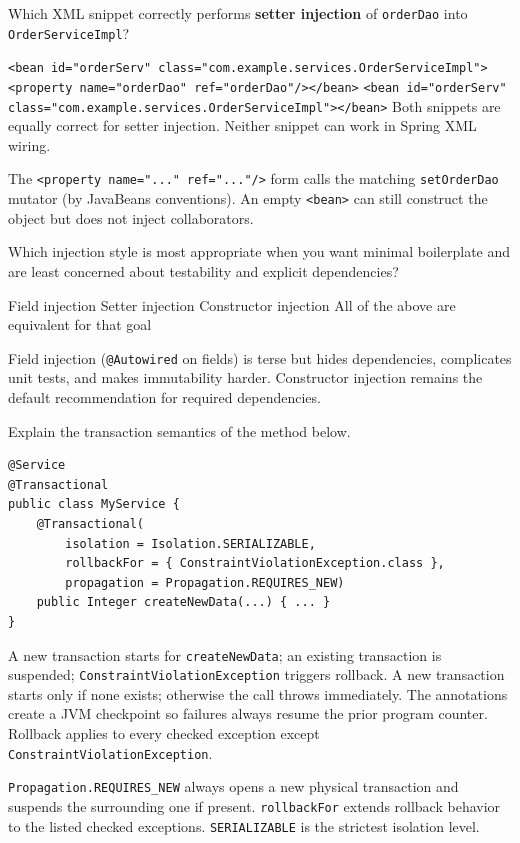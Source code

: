 \question[4]
Which XML snippet correctly performs \textbf{setter injection} of \texttt{orderDao} into \texttt{OrderServiceImpl}?
\begin{choices}
  \CorrectChoice \texttt{<bean id="orderServ" class="com.example.services.OrderServiceImpl"><property name="orderDao" ref="orderDao"/></bean>}
  \choice \texttt{<bean id="orderServ" class="com.example.services.OrderServiceImpl"></bean>}
  \choice Both snippets are equally correct for setter injection.
  \choice Neither snippet can work in Spring XML wiring.
\end{choices}
\begin{solution}
  The \texttt{<property name="..." ref="..."/>} form calls the matching \texttt{setOrderDao} mutator (by JavaBeans conventions). An empty \texttt{<bean>} can still construct the object but does not inject collaborators.
\end{solution}

\question[4]
Which injection style is most appropriate when you want minimal boilerplate and are least concerned about testability and explicit dependencies?
\begin{choices}
  \CorrectChoice Field injection
  \choice Setter injection
  \choice Constructor injection
  \choice All of the above are equivalent for that goal
\end{choices}
\begin{solution}
  Field injection (\texttt{@Autowired} on fields) is terse but hides dependencies, complicates unit tests, and makes immutability harder. Constructor injection remains the default recommendation for required dependencies.
\end{solution}

\question[4]
Explain the transaction semantics of the method below.
\begin{lstlisting}[style=java]
@Service
@Transactional
public class MyService {
    @Transactional(
        isolation = Isolation.SERIALIZABLE,
        rollbackFor = { ConstraintViolationException.class },
        propagation = Propagation.REQUIRES_NEW)
    public Integer createNewData(...) { ... }
}
\end{lstlisting}
\begin{choices}
  \CorrectChoice A new transaction starts for \texttt{createNewData}; an existing transaction is suspended; \texttt{ConstraintViolationException} triggers rollback.
  \choice A new transaction starts only if none exists; otherwise the call throws immediately.
  \choice The annotations create a JVM checkpoint so failures always resume the prior program counter.
  \choice Rollback applies to every checked exception except \texttt{ConstraintViolationException}.
\end{choices}
\begin{solution}
  \texttt{Propagation.REQUIRES\_NEW} always opens a new physical transaction and suspends the surrounding one if present. \texttt{rollbackFor} extends rollback behavior to the listed checked exceptions. \texttt{SERIALIZABLE} is the strictest isolation level.
\end{solution}

